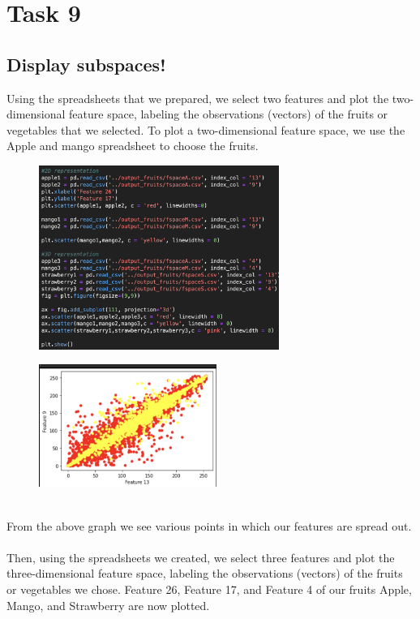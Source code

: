 \documentclass[conference]{IEEEtran}
\begin{document}
\section{Task 9}
\subsection{Display subspaces!}
Using the spreadsheets that we prepared, we select two features and plot the two-dimensional feature space, labeling the observations (vectors) of the fruits or vegetables that we selected. To plot a two-dimensional feature space, we use the Apple and mango spreadsheet to choose the fruits.
\begin{figure}[!htbp]
    \centering
    \includegraphics[height=6cm]{Task9.png} 
   
    \label{fig:my_label}
\end{figure}
\begin{figure}[!htbp]
    \centering
    \includegraphics[height=4cm]{Task9-2d(1).png} 
   
    \label{fig:my_label}
\end{figure}
\\From the above graph we see various points in which our features are spread out.
\\\\
Then, using the spreadsheets we created, we select three features and plot the three-dimensional feature space, labeling the observations (vectors) of the fruits or vegetables we chose. Feature 26, Feature 17, and Feature 4 of our fruits Apple, Mango, and Strawberry are now plotted.
\end{document}
